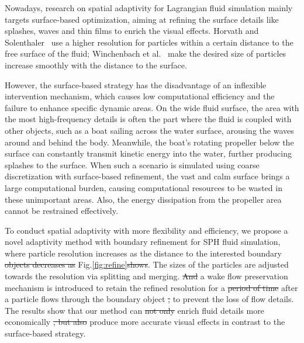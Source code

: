 \documentclass[VANCOUVER,STIX1COL]{WileyNJD-v2}
\providecommand{\DIFadd}[1]{{\protect\color{blue}\uwave{#1}}} %
\providecommand{\DIFdel}[1]{{\protect\color{red}\sout{#1}}}                      %
\providecommand{\DIFaddbegin}{} %
\providecommand{\DIFaddend}{} %
\providecommand{\DIFdelbegin}{} %
\providecommand{\DIFdelend}{} %
\begin{document}
Nowadays, research on spatial adaptivity for Lagrangian fluid simulation mainly targets surface-based optimization, aiming at refining the surface details like splashes, waves and thin films to enrich the visual effects. Horvath and Solenthaler~\cite{Horvath13} use a higher resolution for particles within a certain distance to the free surface of the fluid; Winchenbach et al.~\cite{Winchenbach17} make the desired size of particles increase smoothly with the distance to the surface.

However, the surface-based strategy has the disadvantage of an inflexible intervention mechanism, which causes low computational efficiency and the failure to enhance specific dynamic areas. On the wide fluid surface, the area with the most high-frequency details is often the part where the fluid is coupled with other objects, such as a boat sailing across the water surface, arousing the waves around and behind the body. Meanwhile, the boat's rotating propeller below the surface can constantly transmit kinetic energy into the water, further producing splashes to the surface. When such a scenario is simulated using coarse discretization with surface-based refinement, the vast and calm surface brings a large computational burden, causing computational resources to be wasted in these unimportant areas. Also, the energy dissipation from the propeller area cannot be restrained effectively. 

To conduct spatial adaptivity with more flexibility and efficiency, we propose a novel adaptivity method with boundary refinement for SPH fluid simulation, where particle resolution increases as the distance to the interested boundary \DIFdelbegin \DIFdel{objects decreases as }\DIFdelend \DIFaddbegin \DIFadd{object decreases (see }\DIFaddend Fig.\ref{fig:refine}\DIFdelbegin \DIFdel{shows}\DIFdelend \DIFaddbegin \DIFadd{)}\DIFaddend . The sizes of the particles are adjusted towards the resolution via splitting and merging. \DIFdelbegin \DIFdel{And }\DIFdelend \DIFaddbegin \DIFadd{Moreover, }\DIFaddend a wake flow preservation mechanism is introduced to retain the refined resolution for a \DIFdelbegin \DIFdel{period of time }\DIFdelend \DIFaddbegin \DIFadd{specific period }\DIFaddend after a particle flows through the boundary object \DIFdelbegin \DIFdel{, }\DIFdelend to prevent the loss of flow details. The results show that our method can \DIFdelbegin \DIFdel{not only }\DIFdelend enrich fluid details more economically \DIFdelbegin \DIFdel{, but also }\DIFdelend \DIFaddbegin \DIFadd{and }\DIFaddend produce more accurate visual effects in contrast to the surface-based strategy.
\end{document}
